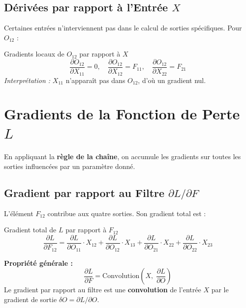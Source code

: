 \documentclass[12pt, a4paper]{article}
\begin{document}
\subsection{Dérivées par rapport à l'Entrée $X$}

Certaines entrées n'interviennent pas dans le calcul de sorties spécifiques.
Pour $O_{12}$ :

\begin{stepbox}{Gradients locaux de $O_{12}$ par rapport à $X$}
\begin{equation}
    \frac{\partial O_{12}}{\partial X_{11}} = 0,\quad
    \frac{\partial O_{12}}{\partial X_{12}} = F_{11},\quad
    \frac{\partial O_{12}}{\partial X_{22}} = F_{21}
\end{equation}
\textit{Interprétation :} $X_{11}$ n'apparaît pas dans $O_{12}$, d'où un gradient nul.
\end{stepbox}

\section{Gradients de la Fonction de Perte $L$}

En appliquant la \textbf{règle de la chaîne}, on accumule les gradients sur
toutes les sorties influencées par un paramètre donné.

\subsection{Gradient par rapport au Filtre $\partial L / \partial F$}

L'élément $F_{12}$ contribue aux quatre sorties. Son gradient total est :

\begin{stepbox}{Gradient total de $L$ par rapport à $F_{12}$}
\begin{equation}
    \frac{\partial L}{\partial F_{12}}
    = \frac{\partial L}{\partial O_{11}} \cdot X_{12}
    + \frac{\partial L}{\partial O_{12}} \cdot X_{13}
    + \frac{\partial L}{\partial O_{21}} \cdot X_{22}
    + \frac{\partial L}{\partial O_{22}} \cdot X_{23}
    \label{eq:grad_F12}
\end{equation}
\end{stepbox}

\begin{propbox}
\textbf{Propriété générale :}
\[
    \frac{\partial L}{\partial F} = \text{Convolution}\!\left(X,\;\frac{\partial L}{\partial O}\right)
\]
Le gradient par rapport au filtre est une \textbf{convolution} de l'entrée $X$
par le gradient de sortie $\delta O = \partial L / \partial O$.
\end{propbox}
\end{document}
